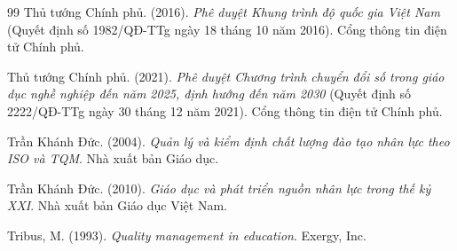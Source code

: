 \begin{thebibliography}{99}
Thủ tướng Chính phủ. (2016). \textit{Phê duyệt Khung trình độ quốc gia Việt Nam} (Quyết định số 1982/QĐ-TTg ngày 18 tháng 10 năm 2016). Cổng thông tin điện tử Chính phủ.

Thủ tướng Chính phủ. (2021). \textit{Phê duyệt Chương trình chuyển đổi số trong giáo dục nghề nghiệp đến năm 2025, định hướng đến năm 2030} (Quyết định số 2222/QĐ-TTg ngày 30 tháng 12 năm 2021). Cổng thông tin điện tử Chính phủ.

Trần Khánh Đức. (2004). \textit{Quản lý và kiểm định chất lượng đào tạo nhân lực theo ISO và TQM}. Nhà xuất bản Giáo dục.

Trần Khánh Đức. (2010). \textit{Giáo dục và phát triển nguồn nhân lực trong thế kỷ XXI}. Nhà xuất bản Giáo dục Việt Nam.

Tribus, M. (1993). \textit{Quality management in education}. Exergy, Inc.

\end{thebibliography}
